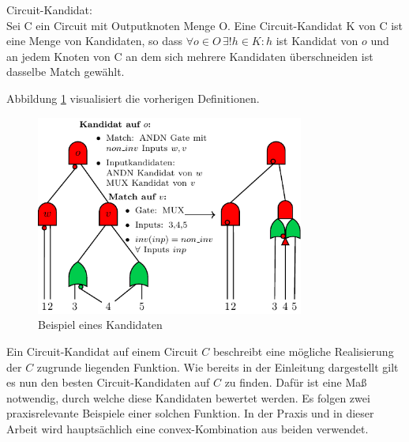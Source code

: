 \documentclass[11pt, a4paper, german]{article}
\begin{document}
\begin{definition}{Circuit-Kandidat:}\\
Sei C ein Circuit mit Outputknoten Menge O. Eine Circuit-Kandidat K von C ist eine Menge von Kandidaten, so dass $\forall o \in O \, \exists!  h  \in K : h$ ist Kandidat von $ o$ und an jedem Knoten von C an dem sich mehrere Kandidaten überschneiden ist dasselbe Match gewählt.
\end{definition}
\newpage
Abbildung \ref{bild:grundl_definitionen} visualisiert die vorherigen Definitionen.\\
\begin{figure}[h]
\begin{center}
 \includegraphics[width = 250pt]{./pictures/compiled/grundl_def_veransch.pdf}
 \caption{Beispiel eines  Kandidaten}
 \label{bild:grundl_definitionen}
\end{center}
\end{figure}

Ein Circuit-Kandidat auf einem Circuit $C$ beschreibt eine mögliche Realisierung der $C$ zugrunde liegenden Funktion.  Wie bereits in der Einleitung dargestellt gilt es nun den besten Circuit-Kandidaten auf $C$ zu finden. Dafür ist eine Maß notwendig, durch welche diese Kandidaten bewertet werden. Es folgen zwei praxisrelevante Beispiele einer solchen Funktion. In der Praxis und in dieser Arbeit wird hauptsächlich eine convex-Kombination aus beiden verwendet.
\end{document}
